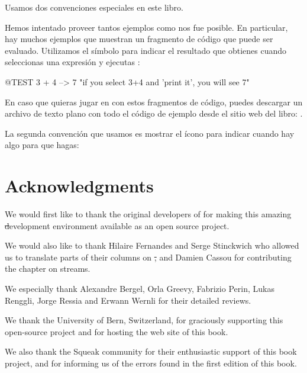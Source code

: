 \documentclass[a4paper,spanish, 10pt,twoside]{book}
\begin{document}
Usamos dos convenciones especiales en este libro.

Hemos intentado proveer tantos ejemplos como nos fue posible.
En particular, hay muchos ejemplos que muestran un fragmento de código que puede ser evaluado. Utilizamos el símbolo \ct{-->} para indicar el resultado que obtienes cuando seleccionas una expresión y ejecutas :

\begin{code}{@TEST}
3 + 4 --> 7    "if you select 3+4 and 'print it', you will see 7"
\end{code}

En caso que quieras jugar en \pharo con estos fragmentos de código, puedes descargar un archivo de texto plano con todo el código de ejemplo desde el sitio web del libro: \pbe.

La segunda convención que usamos es mostrar el ícono \dothisicon{} para indicar cuando hay algo para que hagas:


\section*{Acknowledgments}

We would first like to thank the original developers of \squeak for making this amazing \st development environment available as an open source project.

We would also like to thank Hilaire Fernandes and Serge Stinckwich who allowed us to translate parts of their columns on \st, and Damien Cassou for contributing the chapter on streams.

We especially thank Alexandre Bergel, Orla Greevy, Fabrizio Perin, Lukas Renggli, Jorge Ressia and Erwann Wernli for their detailed reviews.

We thank the University of Bern, Switzerland, for graciously supporting this open-source project and for hosting the web site of this book.

We also thank the Squeak community for their enthusiastic support of this book project, and for informing us of the errors found in the first edition of this book.

\ifx\wholebook\relax\else
   
   
\end{document}
